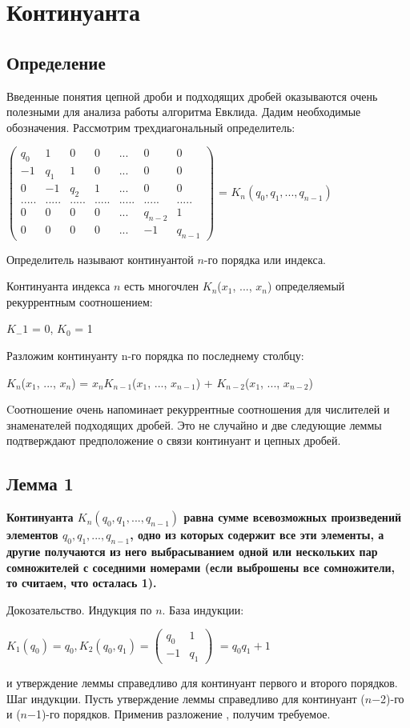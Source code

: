 \documentclass[12pt]{article}
\begin{document}
\section{Континуанта}
\subsection{Определение}
Введенные понятия цепной дроби и подходящих дробей оказываются
очень полезными для анализа работы алгоритма Евклида. Дадим необходимые обозначения. Рассмотрим трехдиагональный определитель:\par
$\begin{pmatrix}
                  q_0 & 1 & 0 & 0 & ... &0 & 0 \\
                  -1 & q_1 & 1 & 0 & ...& 0 & 0 \\
                  0 & -1 & q_2 & 1 & ... &0 & 0\\
                  ..... & ..... & ..... & ..... & ..... & ..... & .....\\
                  0 & 0 & 0 & 0 & ... & q_{n-2} & 1\\
                  0 & 0 & 0 & 0 & ... & -1 & q_{n-1}
                  \end{pmatrix}$
= $K_n(q_0, q_1, ..., q_{n-1})$

Определитель называют континуантой $n$-го порядка или индекса.


Континуанта индекса $n$ есть многочлен $K_n$($x_1$, ..., $x_n$) определяемый рекуррентным соотношением:

    $K_-1$ = 0,   $K_0$ = 1\par
Разложим континуанту n-го порядка по последнему столбцу:\par
    $K_n$($x_1$, ..., $x_n$) = $x_n K_{n-1}$($x_1$, ..., $x_{n-1}$) + $K_{n-2}$($x_1$, ..., $x_{n-2}$)\par
Cоотношение очень напоминает рекуррентные соотношения для числителей и знаменателей подходящих дробей. Это не случайно и две следующие леммы подтверждают предположение о связи континуант и цепных дробей.
\subsection{Лемма 1}
\textbf{Континуанта $K_n(q_0, q_1, . . . , q_{n−1})$ равна сумме всевозможных произведений элементов $q_0, q_1, . . . , q_{n−1}$, одно из которых содержит
все эти элементы, а другие получаются из него выбрасыванием одной или
нескольких пар сомножителей с соседними номерами (если выброшены все
сомножители, то считаем, что осталась 1).}\par
$Докозательство$. Индукция по $n$. База индукции:\par
$K_1(q_0) = q_0, K_2(q_0, q_1) = $$\begin{pmatrix}
                  q_0 & 1 \\
                  -1 & q_1
                  \end{pmatrix}$
$= q_0q_1 + 1$\par
и утверждение леммы справедливо для континуант первого и второго порядков.
Шаг индукции. Пусть утверждение леммы справедливо для континуант ($n$−2)-го и ($n$−1)-го порядков. Применив разложение , получим
требуемое. \par
\end{document}
